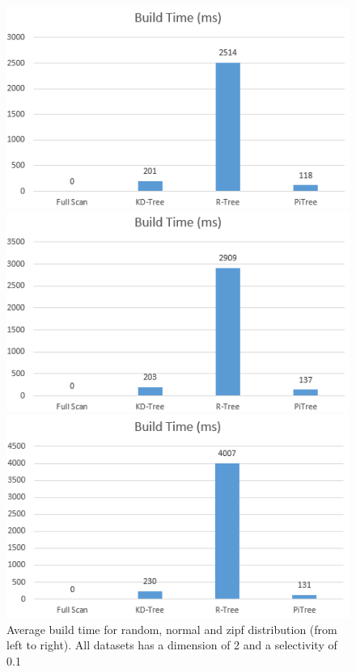 \documentclass[sigconf,10pt]{acmart}
\begin{document}
\begin{figure}[ht] 
  \label{overall-performance-btime} 
  \begin{minipage}[b]{0.33\linewidth}
    \centering
    \includegraphics[width=.8\linewidth]{../figures/overall-performance/random-btime} 
    \vspace{4ex}
  \end{minipage}%
  \begin{minipage}[b]{0.33\linewidth}
    \centering
    \includegraphics[width=.8\linewidth]{../figures/overall-performance/normal-btime} 
    \vspace{4ex}
  \end{minipage}%
  \begin{minipage}[b]{0.33\linewidth}
    \centering
    \includegraphics[width=.8\linewidth]{../figures/overall-performance/zipf-btime} 
    \vspace{4ex}
  \end{minipage}
  \caption{Average build time for random, normal and zipf distribution (from left to right). 
  All datasets has a dimension of 2 and a selectivity of 0.1}
\end{figure}
\end{document}
